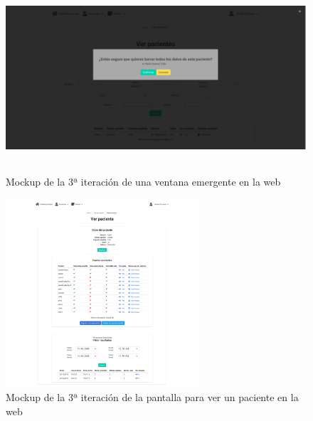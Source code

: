 \begin{figure}[H]
    \centering
    \includegraphics[height=7cm, width=\textwidth]{Imagenes/04DescProblema/mockups/v3/web/04-verPacientes-2.png}
    \caption[Mockup de la 3ª iteración de una ventana emergente en la web]{Mockup de la 3ª iteración de una ventana emergente en la web}
    \label{c4:fig:v3:web:ventanaEmergente}
\end{figure}

\begin{figure}[H]
    \centering
    \includegraphics[height=7cm, width=\textwidth]{Imagenes/04DescProblema/mockups/v3/web/05-verPaciente.png}
    \caption[Mockup de la 3ª iteración de la pantalla para ver un paciente en la web]{Mockup de la 3ª iteración de la pantalla para ver un paciente en la web}
    \label{c4:fig:v3:web:verPaciente}
\end{figure}


